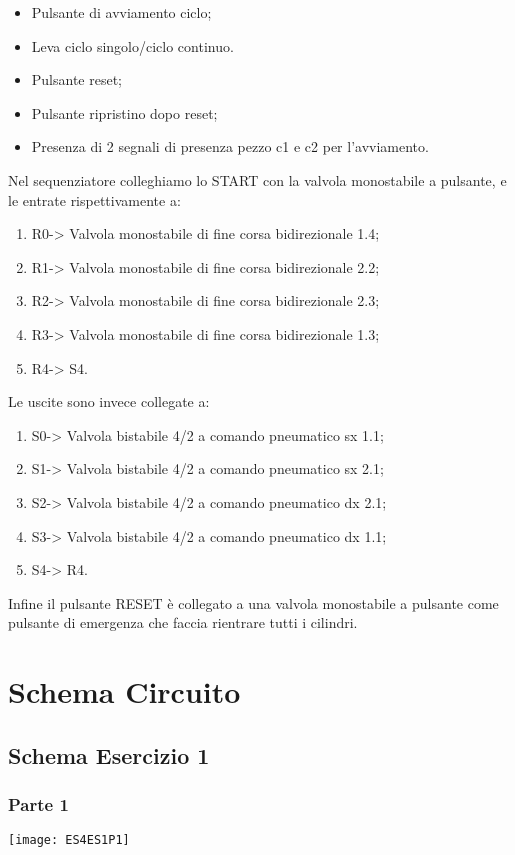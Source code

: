 \documentclass[a4paper]{article}
\begin{document}
\begin{itemize}
\item Pulsante di avviamento ciclo;
\item Leva ciclo singolo/ciclo continuo.
\item Pulsante reset;
\item Pulsante ripristino dopo reset;
\item Presenza di 2 segnali di presenza pezzo c1 e c2 per l’avviamento.
\end{itemize}
 Nel sequenziatore colleghiamo lo START con la valvola monostabile a pulsante, e le entrate rispettivamente a:
\begin{enumerate}
\item R0-> Valvola monostabile di fine corsa bidirezionale 1.4;
\item R1-> Valvola monostabile di fine corsa bidirezionale 2.2;
\item R2-> Valvola monostabile di fine corsa bidirezionale 2.3;
\item R3-> Valvola monostabile di fine corsa bidirezionale 1.3;
\item R4-> S4.
\end{enumerate}
Le uscite sono invece collegate a:
\begin{enumerate}
\item S0-> Valvola bistabile 4/2 a comando pneumatico sx 1.1;
\item S1-> Valvola bistabile 4/2 a comando pneumatico sx 2.1;
\item S2-> Valvola bistabile 4/2 a comando pneumatico dx 2.1;
\item S3-> Valvola bistabile 4/2 a comando pneumatico dx 1.1;
\item S4-> R4.
\end{enumerate}
Infine il pulsante RESET è collegato a una valvola monostabile a pulsante come pulsante di emergenza che faccia rientrare tutti i cilindri.

\section{Schema Circuito}
\subsection{Schema Esercizio 1}
\subsubsection{Parte 1}
\begin{center}
\texttt{[image: ES4ES1P1]}
\end{center}
\end{document}
